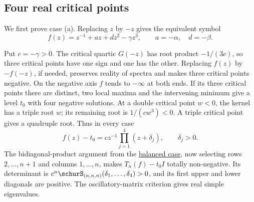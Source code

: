 \subsection[toeplitzRealCriticalHessenberg]{Four real critical points}

We first prove case (a). Replacing $z$ by $-z$ gives the equivalent symbol
\[
 f(z)=z^{-1}+az+dz^2-\gamma z^3,\qquad a=-\alpha,\quad d=-\beta.
\]

\begin{proof*}
Put $c=-\gamma>0$. The critical quartic $G(-z)$ has root product
$-1/(3c)$, so three critical points have one sign and one has the other.
Replacing $f(z)$ by $-f(-z)$, if needed, preserves reality of spectra and
makes three critical points negative.
On the negative axis $f$ tends to $-\infty$ at both ends.
If its three critical points there are distinct, two local maxima and the
intervening minimum give a level $t_0$ with four negative solutions.
At a double critical point $w<0$, the kernel has a triple root $w$;
its remaining root is $1/(cw^3)<0$. A triple critical point gives a
quadruple root. Thus in every case
\[
 f(z)-t_0=cz^{-1}\prod_{j=1}^4(z+\delta_j),\qquad \delta_j>0.
\]
The bidiagonal-product argument from the
\hyperref[toeplitzPentadiagonal]{balanced case}, now selecting rows
$2,\dotsc,n+1$ and columns $1,\dotsc,n$, makes $T_n(f)-t_0I$
totally non-negative. Its determinant is
$c^n\schurS_{(n,n,n)}(\delta_1,\dotsc,\delta_4)>0$, and its first
upper and lower diagonals are positive. The oscillatory-matrix criterion
gives real simple eigenvalues.
\end{proof*}

